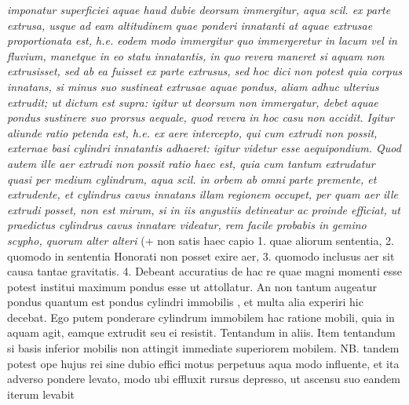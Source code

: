 \textit{imponatur superficiei aquae haud dubie deorsum immergitur, aqua scil. ex parte extrusa, usque ad eam altitudinem quae ponderi innatanti at aquae extrusae proportionata est, h.e. eodem modo immergitur quo immergeretur in lacum vel in fluvium, manetque in eo statu innatantis, in quo revera maneret si aquam non extrusisset, sed ab ea fuisset ex parte 
extrusus, sed hoc dici non potest quia corpus innatans, si minus suo sustineat extrusae aquae pondus, aliam adhuc ulterius extrudit; ut dictum est supra: igitur ut deorsum non immergatur, debet aquae pondus sustinere suo prorsus aequale, quod revera in hoc casu non accidit. Igitur aliunde ratio petenda est, h.e. ex aere intercepto, qui cum extrudi non possit, externae basi cylindri innatantis adhaeret: igitur videtur esse aequipondium. Quod autem ille aer extrudi non possit ratio haec est, quia cum tantum extrudatur quasi per medium cylindrum, aqua scil. in orbem ab omni parte premente, et extrudente, et cylindrus cavus innatans illam regionem occupet, per quam aer ille extrudi posset, non est mirum, si in iis angustiis detineatur ac proinde efficiat, ut praedictus cylindrus cavus innatare videatur, rem facile probabis in gemino scypho, quorum alter alteri }
(+ non satis haec capio 1. quae aliorum sententia, 2. quomodo in sententia Honorati\protect{}
non posset exire aer, 3. quomodo inclusus aer sit causa tantae gravitatis. 4. Debeant accuratius de hac re quae magni momenti esse potest institui
 maximum pondus \textit{}
esse ut attollatur. An non tantum augeatur pondus \textit{} quantum est pondus cylindri immobilis \textit{}, et multa alia experiri hic decebat. Ego putem ponderare cylindrum immobilem hac ratione mobili, quia in aquam agit, eamque extrudit seu ei resistit. Tentandum in aliis. Item tentandum si basis inferior mobilis non attingit immediate  superiorem mobilem. NB. tandem potest ope hujus rei sine dubio 
effici motus perpetuus aqua modo influente, et ita adverso pondere levato, modo ubi effluxit rursus depresso,  ut ascensu suo eandem iterum levabit 
